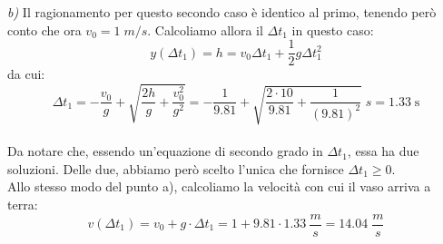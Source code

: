 \documentclass[12pt,a4paper]{book}
\begin{document}

\emph{b)} Il ragionamento per questo secondo caso è identico al primo, tenendo però conto che ora $v_0 = 1 \; m/s$. Calcoliamo allora il $\Delta t_1$ in questo caso:\\
\begin{equation*}
y(\Delta t_1) = h = v_0 \Delta t_1 + \frac{1}{2} g \Delta t_1 ^2 
\end{equation*}
da cui:
\begin{equation*}
\Delta t_1 = -\frac{v_0}{g} + \sqrt{\frac{2 h}{g}+\frac{v_0^2}{g^2}}= -\frac{1}{9.81} + \sqrt{\frac{2 \cdot 10}{9.81}+\frac{1}{(9.81)^2}} \; s = 1.33 \; \text{s} 
\end{equation*}\\
Da notare che, essendo un'equazione di secondo grado in $\Delta t_1$, essa ha due soluzioni. Delle due, abbiamo però scelto l'unica che fornisce $\Delta t_1 \geq 0$.\\
Allo stesso modo del punto a), calcoliamo la velocità con cui il vaso arriva a terra:\\
\begin{equation*}
v(\Delta t_1) = v_0 + g\cdot \Delta t_1 = 1 + 9.81 \cdot 1.33 \: \frac{m}{s} = 14.04 \; \frac{m}{s}
\end{equation*}\\
\end{document}
